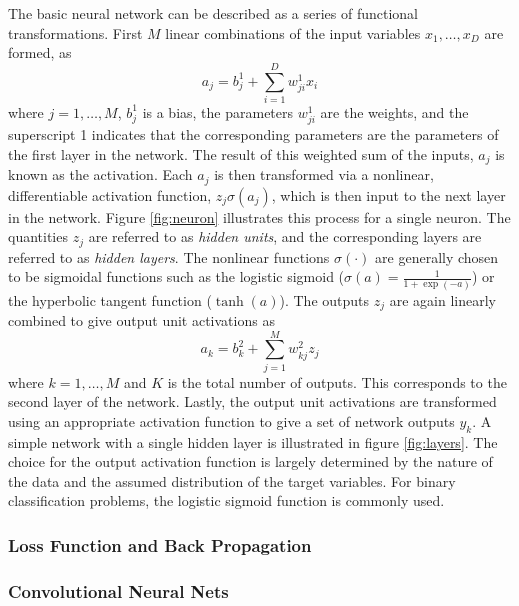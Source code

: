 The basic neural network can be described as a series of functional transformations. First $M$ linear combinations of the input variables $x_1,\dots,x_D$ are formed, as
\begin{equation}
a_j = b_j^{1}+\sum_{i=1}^{D}w_{ji}^{1}x_i
\end{equation}
where $j=1,\dots,M$, $b_j^1$ is a bias, the parameters $w_{ji}^1$ are the weights, and the superscript 1 indicates that the corresponding parameters are the parameters of the first layer in the network. The result of this weighted sum of the inputs, $a_j$ is known as the activation. Each $a_j$ is then transformed via a nonlinear, differentiable activation function, $z_j\sigma(a_j)$, which is then input to the next layer in the network. Figure \ref{fig:neuron} illustrates this process for a single neuron. The quantities $z_j$ are referred to as \textit{hidden units}, and the corresponding layers are referred to as \textit{hidden layers}. The nonlinear functions $\sigma(\cdot)$ are generally chosen to be sigmoidal functions such as the logistic sigmoid ($\sigma(a)=\frac{1}{1+\exp(-a)}$) or the hyperbolic tangent function ($\tanh(a)$). The outputs $z_j$ are again linearly combined to give output unit activations as
\begin{equation}
a_k = b_k^2+\sum_{j=1}^{M}w_{kj}^2z_j
\end{equation} 
where $k=1,\dots,M$ and $K$ is the total number of outputs. This corresponds to the second layer of the network. Lastly, the output unit activations are transformed using an appropriate activation function to give a set of network outputs $y_k$. A simple network with a single hidden layer is illustrated in figure \ref{fig:layers}. The choice for the output activation function is largely determined by the nature of the data and the assumed distribution of the target variables. For binary classification problems, the logistic sigmoid function is commonly used.
\subsubsection{Loss Function and Back Propagation}
\subsubsection{Convolutional Neural Nets}


\cleardoublepage